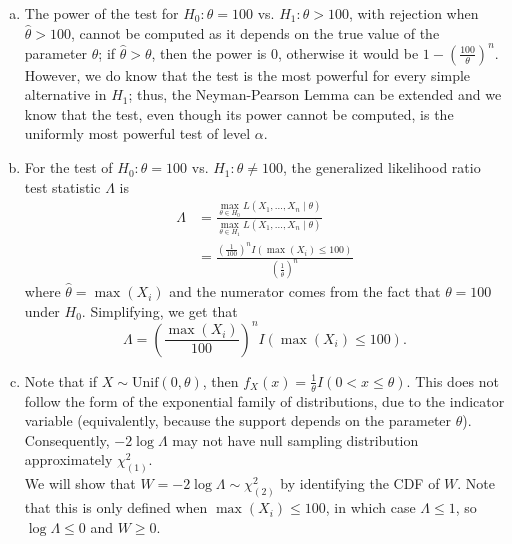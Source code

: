 \documentclass[11pt]{article}
\begin{document}
\begin{enumerate}
\begin{enumerate}[a)]
    \item The power of the test for $H_0 \colon \theta = 100$ vs. $H_1 \colon \theta > 100$, with rejection when $\hat{\theta} > 100$,
    cannot be computed as it depends on the true value of the parameter $\theta$; if $\hat{\theta} > \theta$, then the power is $0$, otherwise it 
    would be $1 - \left( \frac{100}{\theta} \right)^n$. \\

    However, we do know that the test is the most powerful for every simple alternative in $H_1$; thus, the Neyman-Pearson Lemma
    can be extended and we know that the test, even though its power cannot be computed, is the uniformly most powerful test of level $\alpha$.
    
    \item For the test of $H_0 \colon \theta = 100$ vs. $H_1 \colon \theta \neq 100$, the generalized likelihood ratio test statistic $\Lambda$ is
    \begin{align*}
        \Lambda &= \frac{\max\limits_{\theta \in H_0} L(X_1, \dots, X_n \mid \theta)}{\max\limits_{\theta \in H_1} L(X_1, \dots, X_n \mid \theta)} \\
        &= \frac{\left( \frac{1}{100} \right)^n I(\max (X_i) \leq 100)}{\left( \frac{1}{\hat{\theta}} \right)^n}
    \end{align*}
    where $\hat{\theta} = \max (X_i)$ and the numerator comes from the fact that $\theta = 100$ under $H_0$. Simplifying, we get that
    \[
        \boxed{\Lambda = \left(\frac{\max (X_i)}{100}\right)^n I(\max(X_i) \leq 100)}.
    \]

    \item Note that if $X \sim \mathrm{Unif}(0, \theta)$, then $f_X(x) = \frac{1}{\theta}I(0 < x \leq \theta)$. This does not follow the form
    of the exponential family of distributions, due to the indicator variable (equivalently, because the support depends on the parameter $\theta$). Consequently,
    $-2 \log \Lambda$ may not have null sampling distribution approximately $\chi_{(1)}^2$. \\

    We will show that $W = -2 \log \Lambda \sim \chi^2_{(2)}$ by identifying the CDF of $W$. Note that this is only defined when $\max (X_i) \leq 100$, in which case $\Lambda \leq 1$, so $\log \Lambda \leq 0$ and $W \geq  0$. \\
    

\end{enumerate}
\end{enumerate}
\end{document}
